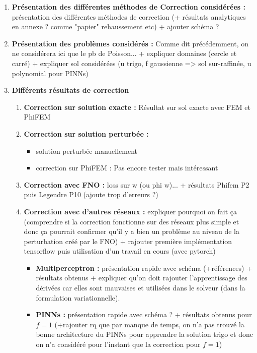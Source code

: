 \begin{enumerate}
	\item \textbf{Présentation des différentes méthodes de Correction considérées :} présentation des différentes méthodes de correction (+ résultats analytiques en annexe ? comme "papier" rehaussement etc)  + ajouter schéma ?
	
	
	\item \textbf{Présentation des problèmes considérés :} Comme dit précédemment, on ne considérera ici que le pb de Poisson... + expliquer domaines (cercle et carré) + expliquer sol considérées (u trigo, f gaussienne => sol sur-raffinée, u polynomial pour PINNs) 
	
	\item \textbf{Différents résultats de correction}
	
	\begin{enumerate}[label=\textbullet]
		\item \textbf{Correction sur solution exacte :} Résultat sur sol exacte avec FEM et PhiFEM
		
		\item \textbf{Correction sur solution perturbée :} 
		\begin{itemize}
			\item solution perturbée manuellement
			\item correction sur PhiFEM : Pas encore tester mais intéressant 
		\end{itemize}
		
		\item \textbf{Correction avec FNO :} loss sur w (ou phi w)... + résultats Phifem P2 puis Legendre P10 (ajoute trop d'erreurs ?)
		
		\item \textbf{Correction avec d'autres réseaux :} expliquer pourquoi on fait ça (comprendre si la correction fonctionne sur des réseaux plus simple et donc ça pourrait confirmer qu'il y a bien un problème au niveau de la perturbation créé par le FNO) + rajouter première implémentation tensorflow puis utilisation d'un travail en cours (avec pytorch)
		\begin{itemize}
			\item \textbf{Multiperceptron :} présentation rapide avec schéma (+références) + résultats obtenus + expliquer qu'on doit rajouter l'apprentissage des dérivées car elles sont mauvaises et utilisées dans le solveur (dans la formulation variationnelle).
			\item \textbf{PINNs :} présentation rapide avec schéma ? + résultats obtenus pour $f=1$ (+rajouter rq que par manque de temps, on n'a pas trouvé la bonne architecture du PINNs pour apprendre la solution trigo et donc on n'a considéré pour l'instant que la correction pour $f=1$)
		\end{itemize} 
	\end{enumerate}

\end{enumerate}

